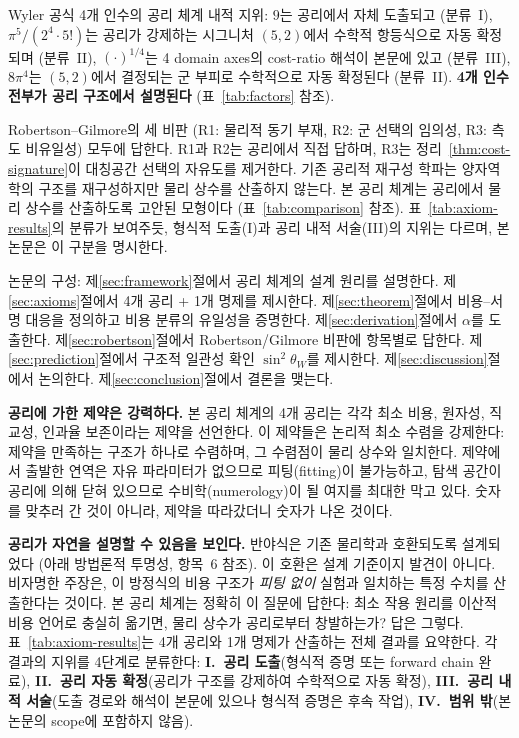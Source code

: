 \documentclass[entropy,article,submit,pdftex,oneauthor]{Definitions/mdpi}
\begin{document}
Wyler 공식 4개 인수의 공리 체계 내적 지위: $9$는 공리에서 자체 도출되고 (분류~I), $\pi^5/(2^4 \cdot 5!)$는 공리가 강제하는 시그니처 $(5,2)$에서 수학적 항등식으로 자동 확정되며 (분류~II), $(\cdot)^{1/4}$는 4 domain axes의 cost-ratio 해석이 본문에 있고 (분류~III), $8\pi^4$는 $(5,2)$에서 결정되는 군 부피로 수학적으로 자동 확정된다 (분류~II). \textbf{4개 인수 전부가 공리 구조에서 설명된다} (표~\ref{tab:factors} 참조).

Robertson--Gilmore의 세 비판 (R1: 물리적 동기 부재, R2: 군 선택의 임의성, R3: 측도 비유일성) 모두에 답한다. R1과 R2는 공리에서 직접 답하며, R3는 정리~\ref{thm:cost-signature}이 대칭공간 선택의 자유도를 제거한다. 기존 공리적 재구성 학파는 양자역학의 구조를 재구성하지만 물리 상수를 산출하지 않는다. 본 공리 체계는 공리에서 물리 상수를 산출하도록 고안된 모형이다 (표~\ref{tab:comparison} 참조). 표~\ref{tab:axiom-results}의 분류가 보여주듯, 형식적 도출(I)과 공리 내적 서술(III)의 지위는 다르며, 본 논문은 이 구분을 명시한다.

논문의 구성: 제\ref{sec:framework}절에서 공리 체계의 설계 원리를 설명한다. 제\ref{sec:axioms}절에서 4개 공리 + 1개 명제를 제시한다. 제\ref{sec:theorem}절에서 비용--서명 대응을 정의하고 비용 분류의 유일성을 증명한다. 제\ref{sec:derivation}절에서 $\alpha$를 도출한다. 제\ref{sec:robertson}절에서 Robertson/Gilmore 비판에 항목별로 답한다. 제\ref{sec:prediction}절에서 구조적 일관성 확인 $\sin^2\theta_W$를 제시한다. 제\ref{sec:discussion}절에서 논의한다. 제\ref{sec:conclusion}절에서 결론을 맺는다.


\textbf{공리에 가한 제약은 강력하다.} 본 공리 체계의 4개 공리는 각각 최소 비용, 원자성, 직교성, 인과율 보존이라는 제약을 선언한다. 이 제약들은 논리적 최소 수렴을 강제한다: 제약을 만족하는 구조가 하나로 수렴하며, 그 수렴점이 물리 상수와 일치한다. 제약에서 출발한 연역은 자유 파라미터가 없으므로 피팅(fitting)이 불가능하고, 탐색 공간이 공리에 의해 닫혀 있으므로 수비학(numerology)이 될 여지를 최대한 막고 있다. 숫자를 맞추러 간 것이 아니라, 제약을 따라갔더니 숫자가 나온 것이다.

\textbf{공리가 자연을 설명할 수 있음을 보인다.} 반야식은 기존 물리학과 호환되도록 설계되었다 (아래 방법론적 투명성, 항목~6 참조). 이 호환은 설계 기준이지 발견이 아니다. 비자명한 주장은, 이 방정식의 비용 구조가 \emph{피팅 없이} 실험과 일치하는 특정 수치를 산출한다는 것이다. 본 공리 체계는 정확히 이 질문에 답한다: 최소 작용 원리를 이산적 비용 언어로 충실히 옮기면, 물리 상수가 공리로부터 창발하는가? 답은 그렇다. 표~\ref{tab:axiom-results}는 4개 공리와 1개 명제가 산출하는 전체 결과를 요약한다. 각 결과의 지위를 4단계로 분류한다: \textbf{I.~공리 도출}(형식적 증명 또는 forward chain 완료), \textbf{II.~공리 자동 확정}(공리가 구조를 강제하여 수학적으로 자동 확정), \textbf{III.~공리 내적 서술}(도출 경로와 해석이 본문에 있으나 형식적 증명은 후속 작업), \textbf{IV.~범위 밖}(본 논문의 scope에 포함하지 않음).
\end{document}
